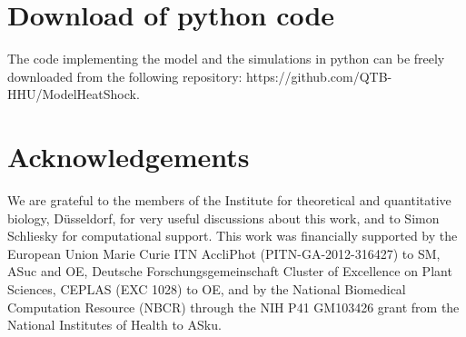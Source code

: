 \documentclass[oneside, 10pt, a4paper, twocolumn]{article}
\begin{document}

%



\section*{Download of python code}

The code implementing the model and the simulations in python can be freely downloaded from the following repository: https://github.com/QTB-HHU/ModelHeatShock.


\section*{Acknowledgements}

We are grateful to the members of the Institute for theoretical and quantitative biology, Düsseldorf, for very useful discussions about this work, and to Simon Schliesky for  computational support.
This work was financially supported by the European Union Marie Curie ITN AccliPhot (PITN-GA-2012-316427) to SM, ASuc and OE, Deutsche Forschungsgemeinschaft Cluster of Excellence on Plant Sciences, CEPLAS (EXC 1028) to OE, and by the National Biomedical Computation Resource (NBCR) through the NIH P41 GM103426 grant from the National Institutes of Health to ASku.
\end{document}
